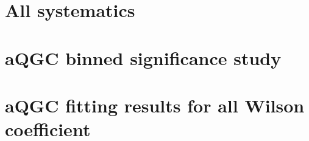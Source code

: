 
%

\clearpage
\section{All systematics}
\label{app:allsyst}


%

\clearpage
\section{aQGC binned significance study}
\label{app:binnedsig}

\clearpage
\section{aQGC fitting results for all Wilson coefficient}
\label{app:aQGCresults}

